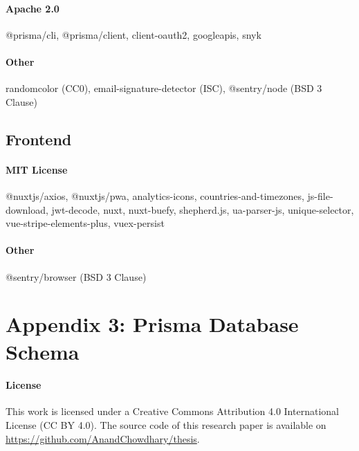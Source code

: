 \documentclass{article}
\begin{document}
\paragraph{Apache 2.0} @prisma/cli, @prisma/client, client-oauth2, googleapis, snyk

\paragraph{Other} randomcolor (CC0), email-signature-detector (ISC), @sentry/node (BSD 3 Clause)

\subsection*{Frontend}

\paragraph{MIT License} @nuxtjs/axios, @nuxtjs/pwa, analytics-icons, countries-and-timezones, js-file-download, jwt-decode, nuxt, nuxt-buefy, shepherd.js, ua-parser-js, unique-selector, vue-stripe-elements-plus, vuex-persist

\paragraph{Other} @sentry/browser (BSD 3 Clause)

\newpage

\section*{Appendix 3: Prisma Database Schema}

\newpage



\paragraph{License} This work is licensed under a Creative Commons Attribution 4.0 International License (CC BY 4.0). The source code of this research paper is available on \url{https://github.com/AnandChowdhary/thesis}.
\end{document}
